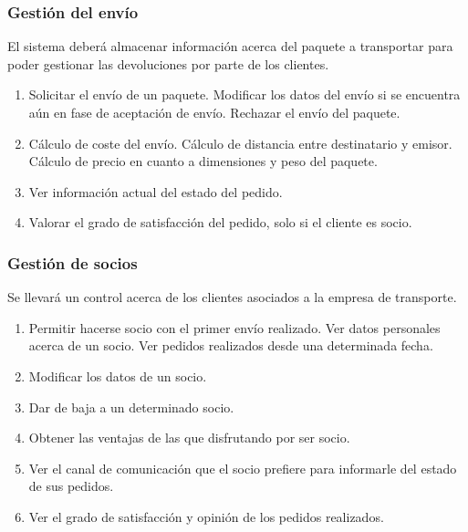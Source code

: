 \subsubsection{Gestión del envío}	
El sistema deberá almacenar información acerca del paquete a transportar para poder gestionar las devoluciones por parte de los clientes. 
\begin{enumerate}
	\item Solicitar el envío de un paquete.
	\subitem Modificar los datos del envío si se encuentra aún en fase de aceptación de envío.
	\subitem Rechazar el envío del paquete.
	\item Cálculo de coste del envío.
	\subitem Cálculo de distancia entre destinatario y emisor.
	\subitem Cálculo de precio en cuanto a dimensiones y peso del paquete.
	\item Ver información actual del estado del pedido.	
	\item Valorar el grado de satisfacción del pedido, solo si el cliente es socio.
\end{enumerate}

\subsubsection{Gestión de socios}
Se llevará un control acerca de los clientes asociados a la empresa de transporte.
\begin{enumerate}
	\item Permitir hacerse socio con el primer envío realizado.
	\subitem Ver datos personales acerca de un socio.
	\subitem Ver pedidos realizados desde una determinada fecha.
	\item Modificar los datos de un socio.
	\item Dar de baja a un determinado socio.
	\item Obtener las ventajas de las que disfrutando por ser socio.
	\item Ver el canal de comunicación que el socio prefiere para informarle del estado de sus pedidos.
	\item Ver el grado de satisfacción y opinión de los pedidos realizados.
\end{enumerate}

